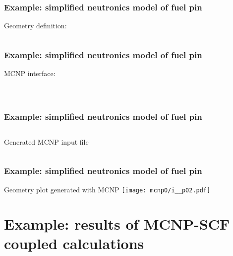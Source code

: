 \documentclass[t]{beamer}
\begin{document}
\newcommand{\exModel}{Example: simplified neutronics model of fuel pin}
\begin{frame}[fragile]
    \frametitle{\exModel}

    Geometry definition:
    \inputminted[frame=single,fontfamily=tt,fontsize=\footnotesize]{python}{geom.py}

\end{frame}

\begin{frame}[fragile]
    \frametitle{\exModel}

    MCNP interface:

    \begin{columns}
            \inputminted[frame=single,fontfamily=tt,fontsize=\footnotesize,firstline=3,lastline=17]{python}{mc_int.py}
            \inputminted[frame=single,fontfamily=tt,fontsize=\footnotesize,firstline=17]{python}{mc_int.py}
    \end{columns}

\end{frame}

\begin{frame}
    \frametitle{\exModel}
    \begin{columns}
            {\tiny Generated MCNP input file}
            \inputminted[frame=single,fontfamily=tt,fontsize=\tiny,firstline=3,lastline=33]{rst}{mcnp0/i_}
            \inputminted[frame=single,fontfamily=tt,fontsize=\tiny,firstline=34]{rst}{mcnp0/i_}
    \end{columns}
\end{frame}

\begin{frame}[fragile]
    \frametitle{\exModel}

    {\small Geometry plot generated with MCNP}
    \texttt{[image: mcnp0/i\_\_p02.pdf]}
\end{frame}


\section{Example: results of MCNP-SCF coupled calculations}
\end{document}
